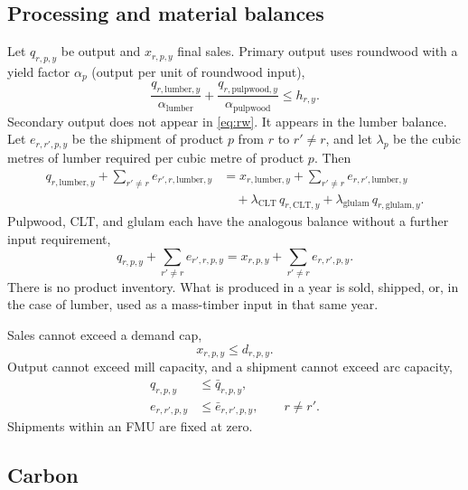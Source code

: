 \documentclass[11pt]{article}
\begin{document}
\subsection{Processing and material balances}

Let $q_{r,p,y}$ be output and $x_{r,p,y}$ final sales. Primary output uses roundwood with a yield factor $\alpha_p$ (output per unit of roundwood input),
\begin{equation}
\frac{q_{r,\mathrm{lumber},y}}{\alpha_{\mathrm{lumber}}}
+ \frac{q_{r,\mathrm{pulpwood},y}}{\alpha_{\mathrm{pulpwood}}}
\le h_{r,y}.
\label{eq:rw}
\end{equation}
Secondary output does not appear in \eqref{eq:rw}. It appears in the lumber balance. Let $e_{r,r',p,y}$ be the shipment of product $p$ from $r$ to $r' \ne r$, and let $\lambda_p$ be the cubic metres of lumber required per cubic metre of product $p$. Then
\begin{equation}
\begin{aligned}
q_{r,\mathrm{lumber},y}
+ \sum_{r' \ne r} e_{r',r,\mathrm{lumber},y}
&= x_{r,\mathrm{lumber},y}
+ \sum_{r' \ne r} e_{r,r',\mathrm{lumber},y} \\
&\quad + \lambda_{\mathrm{CLT}}\, q_{r,\mathrm{CLT},y}
+ \lambda_{\mathrm{glulam}}\, q_{r,\mathrm{glulam},y}.
\end{aligned}
\label{eq:lumber}
\end{equation}
Pulpwood, CLT, and glulam each have the analogous balance without a further input requirement,
\begin{equation}
q_{r,p,y} + \sum_{r' \ne r} e_{r',r,p,y}
= x_{r,p,y} + \sum_{r' \ne r} e_{r,r',p,y}.
\label{eq:bal}
\end{equation}
There is no product inventory. What is produced in a year is sold, shipped, or, in the case of lumber, used as a mass-timber input in that same year.

Sales cannot exceed a demand cap,
\begin{equation}
x_{r,p,y} \le d_{r,p,y}.
\label{eq:dem}
\end{equation}
Output cannot exceed mill capacity, and a shipment cannot exceed arc capacity,
\begin{align}
q_{r,p,y} &\le \bar q_{r,p,y}, \label{eq:mill} \\
e_{r,r',p,y} &\le \bar e_{r,r',p,y}, \qquad r \ne r'. \label{eq:arc}
\end{align}
Shipments within an FMU are fixed at zero.

\subsection{Carbon}
\end{document}
